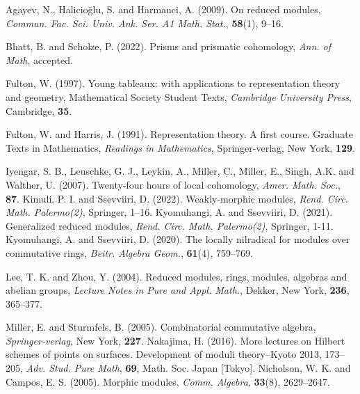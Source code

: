 \documentclass[12pt,a4paper]{article}
\begin{document}
		\begin{thebibliography}{99}
			Agayev, N., Halicio{\u{g}}lu, S. and Harmanci, A. (2009). On reduced modules, {\it Commun. Fac. Sci. Univ. Ank. Ser. A1 Math. Stat.}, {\bf 58}(1), 9--16.
			
			 Bhatt, 
			B. and Scholze, P. (2022). Prisms and prismatic cohomology, {\it Ann. of Math}, accepted.
			
			  Fulton, W. (1997). Young tableaux: with applications to representation theory and geometry, Mathematical Society Student Texts, {\it Cambridge University Press}, Cambridge, {\bf 35}.
			
			 Fulton, W. and Harris, J. (1991). Representation theory. A first course. Graduate Texts in Mathematics, {\it Readings in Mathematics}, Springer-verlag, New York, {\bf 129}.
			
			 Iyengar, S. B., Leuschke, G. J., Leykin, A., Miller, C., Miller, E., Singh, A.K. and Walther, U. (2007). Twenty-four hours of local cohomology, {\it Amer. Math. Soc.}, {\bf 87}.
			 Kimuli, P. I. and Ssevviiri, D. (2022).
			Weakly-morphic modules, {\it Rend. Circ. Math. Palermo(2)}, Springer, 1--16.
			Kyomuhangi, A. and Ssevviiri, D. (2021). Generalized reduced modules, {\it Rend. Circ. Math. Palermo(2)}, Springer, 1-11.		
			Kyomuhangi, A. and Ssevviiri, D. (2020). The locally nilradical for modules over commutative rings, {\it Beitr.  Algebra Geom.}, {\bf 61}(4), 759--769.
			
			Lee, T. K. and Zhou, Y. (2004). Reduced modules, 
			rings, modules, algebras and abelian groups, {\it Lecture Notes in Pure and Appl. Math.}, Dekker, New York, {\bf 236}, 365--377.
			
			 Miller, E. and Sturmfels, B. (2005). Combinatorial commutative algebra,  {\it Springer-verlag}, New York, {\bf 227}.
			Nakajima, H. (2016). More lectures on Hilbert schemes of points on surfaces. Development of moduli theory--Kyoto 2013, 173--205, {\it Adv. Stud. Pure Math}, {\bf 69},
			Math. Soc. Japan [Tokyo].
			 Nicholson, W. K. and Campos, E. S. (2005). Morphic modules,
			{\it Comm. Algebra}, {\bf 33}(8), 2629--2647.
			

\end{thebibliography}
\end{document}
